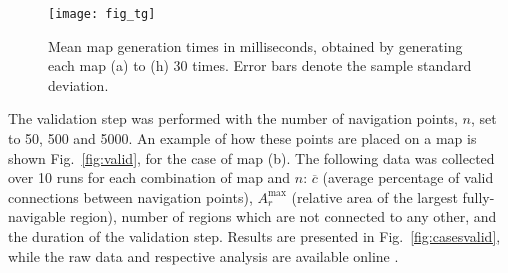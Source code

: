 \documentclass[journal]{IEEEtran}
\begin{document}
\begin{figure}[!t]
  \centering
  \texttt{[image: fig\_tg]}
  \caption{Mean map generation times in milliseconds, obtained by generating each map (a) to
  (h) 30 times. Error bars denote the sample standard deviation.}
  \label{fig:gentimes}
\end{figure}

The validation step was performed with the number of navigation points, $n$, set to 50, 500 and
5000. An example of how these points are placed on a map is shown Fig.~\ref{fig:valid}, for the case
of map (b). The following data was collected over 10 runs for each combination of map and $n$:
$\overline{c}$ (average percentage of valid connections between navigation points),
$A_r^\text{max}$ (relative area of the largest fully-navigable region), number of regions which
are not connected to any other, and the duration of the validation step. Results are presented
in Fig.~\ref{fig:casesvalid}, while the raw data and respective analysis are available online
\cite{fachada2022smdata}.

\begin{figure*}[!t]
    \centering


    \caption{Another perspective of the map in Fig.~\ref{fig:cases:b_exp02}, with the navigation
    points shown. Green navigation points belong to the largest fully-traversable region of
    the map, while red navigation points belong to other regions. (a) Using 50 navigation
    points; (b) using 500 navigation points; (c) using 5000 navigation points.}

    \label{fig:valid}
\end{figure*}
\end{document}
